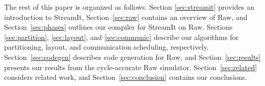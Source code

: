 
The rest of this paper is organized as follows.  Section
\ref{sec:streamit} provides an introduction to StreamIt,
Section~\ref{sec:raw} contains an overview of Raw, and
Section~\ref{sec:phases} outlines our compiler for StreamIt on Raw.
Sections \ref{sec:partition}, \ref{sec:layout}, and \ref{sec:communic}
describe our algorithms for partitioning, layout, and communication
scheduling, respectively.  Section~\ref{sec:codegen} describes code
generation for Raw, and Section~\ref{sec:results} presents our results
from the cycle-accurate Raw simulator.  Section~\ref{sec:related}
considers related work, and Section~\ref{sec:conclusion} contains our
conclusions.
